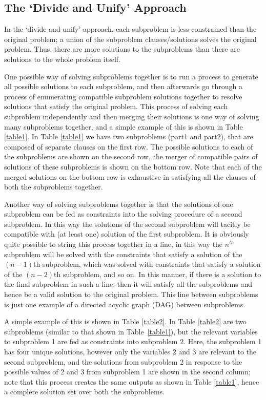 \documentclass[
10pt, %
a4paper, %
oneside, %
headinclude,footinclude, %
BCOR5mm, %
]{scrartcl}
\begin{document}
\subsection{The `Divide and Unify' Approach}

In the `divide-and-unify' approach, each subproblem is less-constrained than the original problem; a union of the subproblem clauses/solutions solves the original problem. Thus, there are more solutions to the subproblems than there are solutions to the whole problem itself.

One possible way of solving subproblems together is to run a process to generate all possible solutions to each subproblem, and then afterwards go through a process of enumerating compatible subproblem solutions together to resolve solutions that satisfy the original problem.
This process of solving each subproblem independently and then merging their solutions is one way of solving many subproblems together, and a simple example of this is shown in Table \ref{table1}. In Table \ref{table1} we have two subproblems (part1 and part2), that are composed of separate clauses on the first row. 
The possible solutions to each of the subproblems are shown on the second row, the merger of compatible pairs of solutions of these subproblems is shown on the bottom row. Note
that each of the merged solutions on the bottom row is exhaustive in satisfying all the clauses of both the subproblems together.

Another way of solving subproblems together is that the solutions of one subproblem can be fed as constraints into the solving procedure of a second subproblem.
In this way the solutions of the second subproblem will tacitly be compatible with (at least one) solution of the first subproblem.
It is obviously quite possible to string this process together in a line, in this way the $n^{th}$ subproblem will be solved with the constraints that satisfy a solution of the $(n-1)$th 
subproblem, which was solved with constraints that satisfy a solution of the $(n-2)$th subproblem, and so on.
In this manner, if there is a solution to the final subproblem in such a line, then it will satisfy all the subproblems and hence be a valid solution to the original problem.
This line between subproblems is just one example of a directed acyclic graph (DAG) between subproblems.

A simple example of this is shown in Table \ref{table2}. In Table \ref{table2} are two subproblems (similar to that shown in Table~\ref{table1}), 
but the relevant variables to subproblem 1 are fed as constraints into subproblem 2.
Here, the subproblem 1 has four unique solutions, however only the variables $2$ and $3$ are relevant to the second subproblem, and the solutions from subproblem 2 in response to the possible values of $2$ and $3$ from subproblem 1 are shown in the second column; note that this process creates the same outputs as shown in Table \ref{table1}, hence a complete solution set over both the subproblems.
\end{document}
